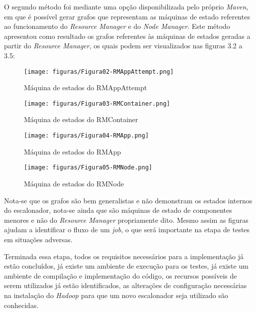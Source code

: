 O segundo método foi mediante uma opção disponibilizada pelo próprio \emph{Maven}, em que é possível gerar grafos que representam as máquinas de estado referentes ao funcionamento do \emph{Resource Manager} e do \emph{Node Manager}. Este método apresentou como resultado os grafos referentes às máquinas de estados geradas a partir do \emph{Resource Manager}, os quais podem ser visualizados nas figuras 3.2 a 3.5:

\begin{figure}[hbtn]
   \centering
   \texttt{[image: figuras/Figura02-RMAppAttempt.png]}
   \caption{Máquina de estados do RMAppAttempt}
   \label{fig:RMAppAttempt}
\end{figure}

\begin{figure}[hbtn]
   \centering
   \texttt{[image: figuras/Figura03-RMContainer.png]}
   \caption{Máquina de estados do RMContainer}
   \label{fig:RMContainer}
\end{figure}

\begin{figure}[hbtn]
   \centering
   \texttt{[image: figuras/Figura04-RMApp.png]}
   \caption{Máquina de estados do RMApp}
   \label{fig:RMApp}
\end{figure}

\begin{figure}[hbtn]
   \centering
   \texttt{[image: figuras/Figura05-RMNode.png]}
   \caption{Máquina de estados do RMNode}
   \label{fig:RMNode}
\end{figure}

Nota-se que os grafos são bem generalistas e não demonstram os estados internos do escalonador, nota-se ainda que são máquinas de estado de componentes menores e não do \emph{Resource Manager} propriamente dito. Mesmo assim as figuras ajudam a identificar o fluxo de um \emph{job}, o que será importante na etapa de testes em situações adversas.

Terminada essa etapa, todos os requisitos necessários para a implementação já estão concluídos, já existe um ambiente de execução para os testes, já existe um ambiente de compilação e implementação do código, os recursos possíveis de serem utilizados já estão identificados, as alterações de configuração necessárias na instalação do \emph{Hadoop} para que um novo escalonador seja utilizado são conhecidas.